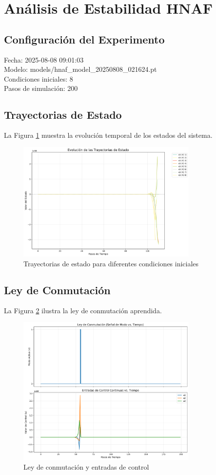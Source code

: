 \section{Análisis de Estabilidad HNAF}

\subsection{Configuración del Experimento}
Fecha: 2025-08-08 09:01:03\\Modelo: models/hnaf_model_20250808_021624.pt\\Condiciones iniciales: 8\\Pasos de simulación: 200

\subsection{Trayectorias de Estado}
La Figura \ref{fig:trajectories} muestra la evolución temporal de los estados del sistema.

\begin{figure}[h]
\centering
\includegraphics[width=0.8\textwidth]{plot_trajectories.png}
\caption{Trayectorias de estado para diferentes condiciones iniciales}
\label{fig:trajectories}
\end{figure}

\subsection{Ley de Conmutación}
La Figura \ref{fig:switching} ilustra la ley de conmutación aprendida.

\begin{figure}[h]
\centering
\includegraphics[width=0.8\textwidth]{plot_switching_signal.png}
\caption{Ley de conmutación y entradas de control}
\label{fig:switching}
\end{figure}

